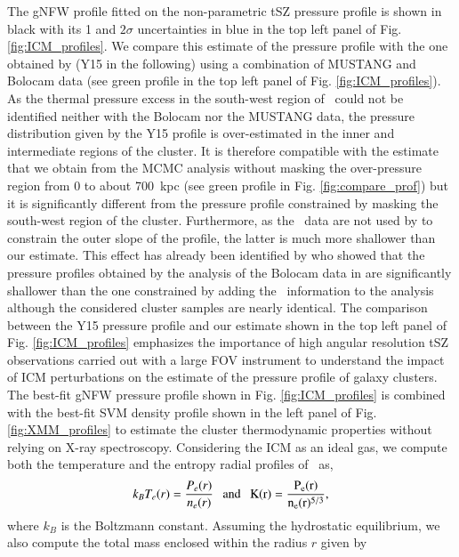 \documentclass[traditabstract]{aa}
\begin{document}
\indent The gNFW profile fitted on the non-parametric tSZ pressure profile is shown in black with its 1 and $2\sigma$ uncertainties in blue in the top left panel of Fig. \ref{fig:ICM_profiles}. We compare this estimate of the pressure profile with the one obtained by \cite{you15} (Y15 in the following) using a combination of MUSTANG and Bolocam data (see green profile in the top left panel of Fig. \ref{fig:ICM_profiles}). As the thermal pressure excess in the south-west region of \psz\ could not be identified neither with the Bolocam nor the MUSTANG data, the pressure distribution given by the Y15 profile is over-estimated in the inner and intermediate regions of the cluster. It is therefore compatible with the estimate that we obtain from the MCMC analysis without masking the over-pressure region from 0 to about 700~kpc (see green profile in Fig. \ref{fig:compare_prof}) but it is significantly different from the pressure profile constrained by masking the south-west region of the cluster. Furthermore, as the \planck\ data are not used by \cite{you15} to constrain the outer slope of the profile, the latter is much more shallower than our estimate. This effect has already been identified by \cite{say16} who showed that the pressure profiles obtained by the analysis of the Bolocam data in \cite{say13} are significantly shallower than the one constrained by adding the \planck\ information to the analysis although the considered cluster samples are nearly identical. The comparison between the Y15 pressure profile and our estimate shown in the top left panel of Fig. \ref{fig:ICM_profiles} emphasizes the importance of high angular resolution tSZ observations carried out with a large FOV instrument to understand the impact of ICM perturbations on the estimate of the pressure profile of galaxy clusters.\\
\indent The best-fit gNFW pressure profile shown in Fig. \ref{fig:ICM_profiles} is combined with the best-fit SVM density profile shown in the left panel of Fig. \ref{fig:XMM_profiles} to estimate the cluster thermodynamic properties without relying on X-ray spectroscopy. Considering the ICM as an ideal gas, we compute both the temperature and the entropy radial profiles of \psz\ as, 
\begin{equation}
k_B T_e(r) = \frac{P_e(r)}{n_e(r)}~~~\rm{and}~~~K(r) =  \frac{P_e(r)}{n_e(r)^{5/3}},
\label{eq:temp_entro}
\end{equation}
where $k_B$ is the Boltzmann constant. Assuming the hydrostatic equilibrium, we also compute the total mass enclosed within the radius $r$ given by
\end{document}
